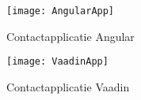 \begin{figure}[H]
	\centering
	\texttt{[image: AngularApp]}
	\caption{Contactapplicatie Angular}
	\label{fig:ContactapplicatieAngular}
\end{figure}

\begin{figure}[H]
	\centering
	\texttt{[image: VaadinApp]}
	\caption{Contactapplicatie Vaadin}
	\label{fig:ContactapplicatieVaadin}
\end{figure}

